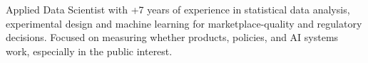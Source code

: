 \documentclass{resume} %
\begin{document}

{\small
Applied Data Scientist with +7 years of experience in statistical data
analysis, experimental design and machine learning for marketplace-quality and
regulatory decisions. Focused on measuring whether products, policies, and AI
systems work, especially in the public interest.
\par}

\medskip

\end{document}
